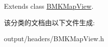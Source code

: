 Extends class \hyperlink{interface_b_m_k_map_view_a4fa740d5b128accf89a08af73885f5fd}{B\+M\+K\+Map\+View}.



该分类的文档由以下文件生成\+:\begin{DoxyCompactItemize}
\item 
output/headers/B\+M\+K\+Map\+View.\+h\end{DoxyCompactItemize}
